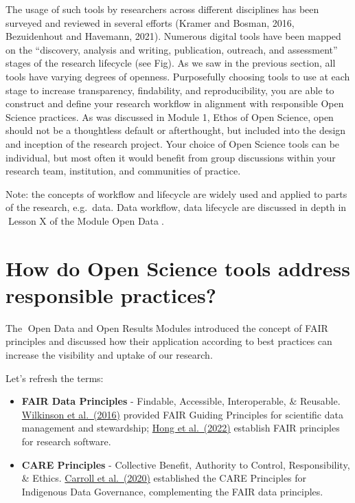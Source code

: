 \documentclass[
  letterpaper,
  DIV=11,
  numbers=noendperiod]{scrreport}
\providecommand{\tightlist}{%
  \setlength{\itemsep}{0pt}\setlength{\parskip}{0pt}}\usepackage{longtable,booktabs,array}
\begin{document}
The usage of such tools by researchers across different disciplines has
been surveyed and reviewed in several efforts (Kramer and Bosman, 2016,
Bezuidenhout and Havemann, 2021). Numerous digital tools have been
mapped on the ``discovery, analysis and writing, publication, outreach,
and assessment'' stages of the research lifecycle (see Fig). As we saw
in the previous section, all tools have varying degrees of openness.
Purposefully choosing tools to use at each stage to increase
transparency, findability, and reproducibility, you are able to
construct and define your research workflow in alignment with
responsible Open Science practices. As was discussed in Module 1, Ethos
of Open Science, open should not be a thoughtless default or
afterthought, but included into the design and inception of the research
project. Your choice of Open Science tools can be individual, but most
often it would benefit from group discussions within your research team,
institution, and communities of practice.

Note: the concepts of workflow and lifecycle are widely used and applied
to parts of the research, e.g.~data. Data workflow, data lifecycle are
discussed in depth in 🔗Lesson X of the Module Open Data🔗.

\hypertarget{how-do-open-science-tools-address-responsible-practices}{%
\section*{How do Open Science tools address responsible
practices?}\label{how-do-open-science-tools-address-responsible-practices}}


The 🔗Open Data and Open Results🔗Modules introduced the concept of FAIR
principles and discussed how their application according to best
practices can increase the visibility and uptake of our research.

Let's refresh the terms:

\begin{itemize}
\tightlist
\item
  \textbf{FAIR Data Principles} - Findable, Accessible, Interoperable,
  \& Reusable. \href{https://doi.org/10.1038/sdata.2016.18}{Wilkinson et
  al.~(2016)} provided FAIR Guiding Principles for scientific data
  management and stewardship;
  \href{https://doi.org/10.15497/RDA00068}{Hong et al.~(2022)} establish
  FAIR principles for research software.
\item
  \textbf{CARE Principles} - Collective Benefit, Authority to Control,
  Responsibility, \& Ethics.
  \href{http://doi.org/10.5334/dsj-2020-043}{Carroll et al.~(2020)}
  established the CARE Principles for Indigenous Data Governance,
  complementing the FAIR data principles.
\end{itemize}
\end{document}
